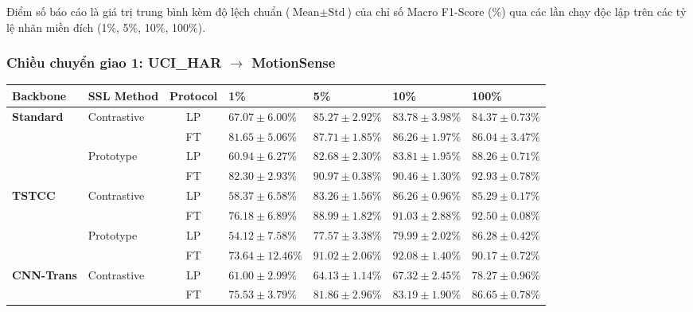 Điểm số báo cáo là giá trị trung bình kèm độ lệch chuẩn ($\text{Mean} \pm \text{Std}$) của chỉ số Macro F1-Score (\%) qua các lần chạy độc lập trên các tỷ lệ nhãn miền đích (1\%, 5\%, 10\%, 100\%).

\subsubsection{Chiều chuyển giao 1: UCI\_HAR $\rightarrow$ MotionSense}

\begin{table}[H]
\centering
\small
\renewcommand{\arraystretch}{1.15}
\begin{tabularx}{\textwidth}{llcXXXX}
\toprule
\textbf{Backbone} & \textbf{SSL Method} & \textbf{Protocol} & \textbf{1\%} & \textbf{5\%} & \textbf{10\%} & \textbf{100\%} \\
\midrule
\multirow{4}{*}{\textbf{Standard}} 
  & \multirow{2}{*}{Contrastive} & LP & $67.07 \pm 6.00\%$ & $85.27 \pm 2.92\%$ & $83.78 \pm 3.98\%$ & $84.37 \pm 0.73\%$ \\
  &                              & FT & $81.65 \pm 5.06\%$ & $87.71 \pm 1.85\%$ & $86.26 \pm 1.97\%$ & $86.04 \pm 3.47\%$ \\
  \cmidrule(lr){2-7}
  & \multirow{2}{*}{Prototype}   & LP & $60.94 \pm 6.27\%$ & $82.68 \pm 2.30\%$ & $83.81 \pm 1.95\%$ & $88.26 \pm 0.71\%$ \\
  &                              & FT & $82.30 \pm 2.93\%$ & $90.97 \pm 0.38\%$ & $90.46 \pm 1.30\%$ & $92.93 \pm 0.78\%$ \\
\midrule
\multirow{4}{*}{\textbf{TSTCC}} 
  & \multirow{2}{*}{Contrastive} & LP & $58.37 \pm 6.58\%$ & $83.26 \pm 1.56\%$ & $86.26 \pm 0.96\%$ & $85.29 \pm 0.17\%$ \\
  &                              & FT & $76.18 \pm 6.89\%$ & $88.99 \pm 1.82\%$ & $91.03 \pm 2.88\%$ & $92.50 \pm 0.08\%$ \\
  \cmidrule(lr){2-7}
  & \multirow{2}{*}{Prototype}   & LP & $54.12 \pm 7.58\%$ & $77.57 \pm 3.38\%$ & $79.99 \pm 2.02\%$ & $86.28 \pm 0.42\%$ \\
  &                              & FT & $73.64 \pm 12.46\%$ & $91.02 \pm 2.06\%$ & $92.08 \pm 1.40\%$ & $90.17 \pm 0.72\%$ \\
\midrule
\multirow{4}{*}{\textbf{CNN-Trans}} 
  & \multirow{2}{*}{Contrastive} & LP & $61.00 \pm 2.99\%$ & $64.13 \pm 1.14\%$ & $67.32 \pm 2.45\%$ & $78.27 \pm 0.96\%$ \\
  &                              & FT & $75.53 \pm 3.79\%$ & $81.86 \pm 2.96\%$ & $83.19 \pm 1.90\%$ & $86.65 \pm 0.78\%$ \\

\end{tabularx}
\end{table}
